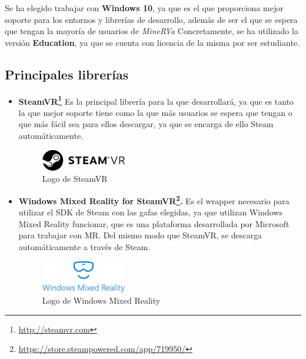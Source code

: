 Se ha elegido trabajar con \textbf{Windows 10}, ya que es el que proporciona mejor soporte para los entornos y librerías de desarrollo, además de ser el que se espera que tengan la mayoría de usuarios de \textit{MineRVa} Concretamente, se ha utilizado la versión \textbf{Education}, ya que se cuenta con licencia de la misma por ser estudiante.

\subsection{Principales librerías}

\begin{itemize}
    \item \textbf{SteamVR\footnote{\url{http://steamvr.com}}} Es la principal librería para la que desarrollará, ya que es tanto la que mejor soporte tiene como la que más usuarios se espera que tengan o que más fácil sea para ellos descargar, ya que se encarga de ello Steam automáticamente.
    
\begin{figure}[!h]
\begin{center}
\includegraphics[width=0.35\textwidth]{imagenes/4/steamvr-logo.jpg}
\caption{Logo de SteamVR}
\label{fig:steamvr-logo}
\end{center}
\end{figure}

    \item \textbf{Windows Mixed Reality for SteamVR\footnote{\url{https://store.steampowered.com/app/719950/}}.} Es el wrapper necesario para utilizar el SDK de Steam con las gafas elegidas, ya que utilizan Windows Mixed Reality funcionar, que es una plataforma desarrollada por Microsoft para trabajar con \acs{MR}. Del mismo modo que SteamVR, se descarga automáticamente a través de Steam.

\begin{figure}[!h]
\begin{center}
\includegraphics[width=0.35\textwidth]{imagenes/4/wmr-logo.jpg}
\caption{Logo de Windows Mixed Reality}
\label{fig:wmr-logo}
\end{center}
\end{figure}


\end{itemize}
